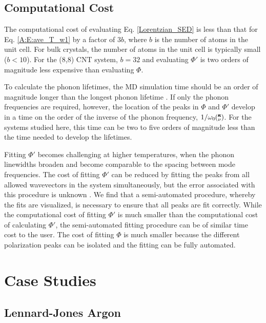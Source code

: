 \documentclass[12pt,twocolumn,iop]{/usr/share/texmf-texlive/tex/latex/iop/iopart}[/usr/share/texmf-texlive/tex/latex/iop/]
\newcommand{\kv}{\mspace{-4.0mu}\left(\mspace{-8.0mu}\begin{smallmatrix}&\pmb{\kappa} \\&\nu\end{smallmatrix}\mspace{-3.0mu}\right)}
\begin{document}
\subsection{\label{Subsection_Comp_Details_4}Computational Cost}

The computational cost of evaluating Eq. \eqref{Lorentzian_SED} is less than that for Eq$.$ \eqref{A:E:ave_T_w1} by a factor of $3b$, where $b$ is the number of atoms in the unit cell.  For bulk crystals, the number of atoms in the unit cell is typically small ($b<10$).  For the (8,8) CNT system, $b=32$ and evaluating $\Phi'$ is two orders of magnitude less expensive than evaluating $\Phi$.

To calculate the phonon lifetimes, the MD simulation time should be an order of magnitude longer than the longest phonon lifetime \cite{thomasthesis}.  If only the phonon frequencies are required, however, the location of the peaks in $\Phi$ and $\Phi'$ develop in a time on the order of the inverse of the phonon frequency, $1/\omega_0\kv$. For the systems studied here, this time can be two to five orders of magnitude less than the time needed to develop the lifetimes.

Fitting $\Phi'$ becomes challenging at higher temperatures, when the phonon linewidths broaden and become comparable to the spacing between mode frequencies. The cost of fitting $\Phi'$ can be reduced by fitting the peaks from all allowed wavevectors in the system simultaneously, but the error associated with this procedure is unknown \cite{shiomi2011a}. We find that a semi-automated procedure, whereby the fits are visualized, is necessary to ensure that all peaks are fit correctly.  While the computational cost of fitting $\Phi'$ is much smaller than the computational cost of calculating $\Phi'$, the semi-automated fitting procedure can be of similar time cost to the user. The cost of fitting $\Phi$ is much smaller because the different polarization peaks can be isolated and the fitting can be fully automated.

\section{\label{S:Section_Prop}Case Studies}

\subsection{\label{S:Subsection_prop_LJ}Lennard-Jones Argon}
\end{document}
